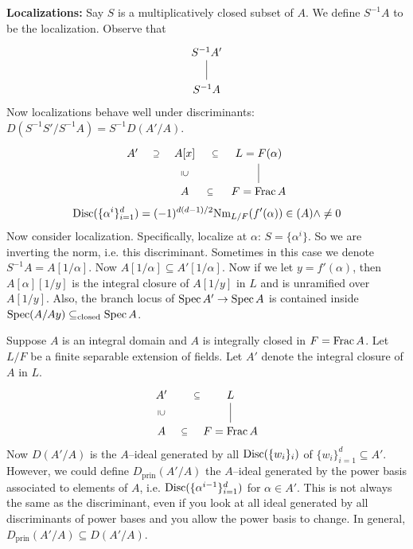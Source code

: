 \noindent\textbf{Localizations:} Say $S$ is a multiplicatively closed subset of $A$. We define $S^{-1}A$ to be the localization. Observe that
	\[
	\begin{tikzcd}
	S^{-1}A' \arrow[dash]{d} \\
	S^{-1}A
	\end{tikzcd}
	\]	
Now localizations behave well under discriminants: $D(S^{-1}S'/S^{-1}A)=S^{-1}D(A'/A)$.
	\[
	\begin{tikzcd}
	 A' \arrow[draw=none]{r}[sloped,auto=false]{\supseteq} & A[x] \arrow[draw=none]{d}[sloped,auto=false]{\supseteq} \arrow[draw=none]{r}[sloped,auto=false]{\subseteq} & L=F(\alpha) \arrow[dash]{d} \\
	& A \arrow[draw=none]{r}[sloped,auto=false]{\subseteq} & F=\Frac A
	\end{tikzcd}
	\] 
	\[
	\operatorname{Disc}(\{\alpha^i\}_{i=1}^d)= (-1)^{d(d-1)/2} \text{Nm}_{L/F}(f'(\alpha)) \in (A) \wedge \neq 0
	\]
Now consider localization. Specifically, localize at $\alpha$: $S=\{\alpha^i\}$. So we are inverting the norm, i.e. this discriminant. Sometimes in this case we denote $S^{-1}A=A[1/\alpha]$. Now $A[1/\alpha] \subseteq A'[1/\alpha]$. Now if we let $y= f'(\alpha)$, then $A[\alpha][1/y]$ is the integral closure of $A[1/y]$ in $L$ and is unramified over $A[1/y]$. Also, the branch locus of $\operatorname{Spec} A' \to \operatorname{Spec} A$ is contained inside $\operatorname{Spec}(A/Ay) \subseteq_{\text{closed}} \operatorname{Spec} A$.


\begin{dfn}
Suppose $A$ is an integral domain and $A$ is integrally closed in $F=\operatorname{Frac} A$. Let $L/F$ be a finite separable extension of fields. Let $A'$ denote the integral closure of $A$ in $L$. 
	\[
	\begin{tikzcd}
	 A' \arrow[draw=none]{d}[sloped,auto=false]{\supseteq} \arrow[draw=none]{r}[sloped,auto=false]{\subseteq} & L \arrow[dash]{d} \\
	A \arrow[draw=none]{r}[sloped,auto=false]{\subseteq} & F=\Frac A
	\end{tikzcd}
	\] 
Now $D(A'/A)$ is the $A$--ideal generated by all $\operatorname{Disc}(\{w_i\}_i)$ of $\{w_i\}_{i=1}^d \subseteq A'$. However, we could define $D_{\text{prin}}(A'/A)$ the $A$--ideal generated by the power basis associated to elements of $A$, i.e. $\operatorname{Disc}(\{\alpha^{i-1}\}_{i=1}^d)$ for $\alpha \in A'$. This is not always the same as the discriminant, even if you look at all ideal generated by all discriminants of power bases and you allow the power basis to change. In general, $D_{\text{prin}}(A'/A) \subseteq D(A'/A)$.
\end{dfn}

